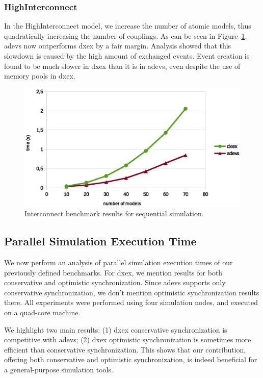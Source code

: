 \subsubsection{HighInterconnect}
In the HighInterconnect model, we increase the number of atomic models, thus quadratically increasing the number of couplings.
As can be seen in Figure~\ref{fig:Interconnect_benchmark}, adevs now outperforms dxex by a fair margin.
Analysis showed that this slowdown is caused by the high amount of exchanged events.
Event creation is found to be much slower in dxex than it is in adevs, even despite the use of memory pools in dxex.

\begin{figure}
	\includegraphics[width=\columnwidth]{fig/interconnect_sequential.eps}
	\caption{Interconnect benchmark results for sequential simulation.}
	\label{fig:Interconnect_benchmark}
\end{figure}

\subsection{Parallel Simulation Execution Time}
We now perform an analysis of parallel simulation execution times of our previously defined benchmarks.
For dxex, we mention results for both conservative and optimistic synchronization.
Since adevs supports only conservative synchronization, we don't mention optimistic synchronization results there.
All experiments were performed using four simulation nodes, and executed on a quad-core machine.

We highlight two main results:
(1) dxex conservative synchronization is competitive with adevs;
(2) dxex optimistic synchronization is sometimes more efficient than conservative synchronization.
This shows that our contribution, offering both conservative and optimistic synchronization, is indeed beneficial for a general-purpose simulation tools.

